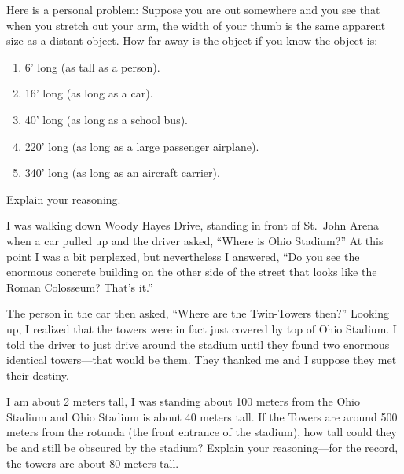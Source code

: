 \documentclass[nooutcomes]{ximera}
\begin{document}
\begin{question}
Here is a personal problem: Suppose you are out somewhere and
  you see that when you stretch out your arm, the width of your thumb
  is the same apparent size as a distant object. How far away is the
  object if you know the object is:
\begin{enumerate}
\item 6' long (as tall as a person).
\item 16' long (as long as a car).
\item 40' long (as long as a school bus).
\item 220' long (as long as a large passenger airplane).
\item 340' long (as long as an aircraft carrier).
\end{enumerate}
Explain your reasoning.
\begin{freeResponse}
\begin{hint}
\end{hint}
\end{freeResponse}
\end{question}

\begin{question}
I was walking down Woody Hayes Drive, standing in front of
  St.\ John Arena when a car pulled up and the driver asked, ``Where
  is Ohio Stadium?'' At this point I was a bit perplexed, but
  nevertheless I answered, ``Do you see the enormous concrete building
  on the other side of the street that looks like the Roman Colosseum?
  That's it.''
 
The person in the car then asked, ``Where are the Twin-Towers then?''
Looking up, I realized that the towers were in fact just covered by
top of Ohio Stadium. I told the driver to just drive around the
stadium until they found two enormous identical towers---that would be
them. They thanked me and I suppose they met their destiny.

I am about 2 meters tall, I was standing about 100 meters from the
Ohio Stadium and Ohio Stadium is about 40 meters tall. If the Towers
are around 500 meters from the rotunda (the front entrance of the
stadium), how tall could they be and still be obscured by the stadium?
Explain your reasoning---for the record, the towers are about 80
meters tall.
\begin{freeResponse}
\begin{hint}
\end{hint}
\end{freeResponse}
\end{question}
\end{document}
